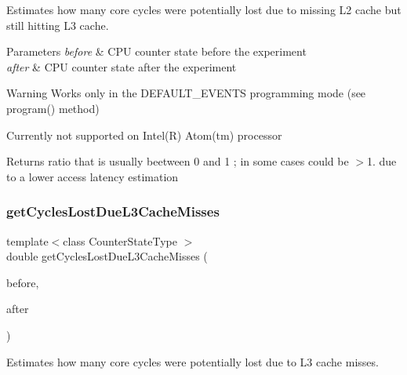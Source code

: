 Estimates how many core cycles were potentially lost due to missing L2 cache but still hitting L3 cache. 


\begin{DoxyParams}{Parameters}
{\em before} & C\+PU counter state before the experiment \\
\hline
{\em after} & C\+PU counter state after the experiment \\
\hline
\end{DoxyParams}
\begin{DoxyWarning}{Warning}
Works only in the D\+E\+F\+A\+U\+L\+T\+\_\+\+E\+V\+E\+N\+TS programming mode (see program() method) 

Currently not supported on Intel(\+R) Atom(tm) processor 
\end{DoxyWarning}
\begin{DoxyReturn}{Returns}
ratio that is usually beetween 0 and 1 ; in some cases could be $>$1. due to a lower access latency estimation 
\end{DoxyReturn}
\mbox{\label{class_basic_counter_state_a89d4cef9c83db7e76be6a0a2e7351e2e}} 
\subsubsection{\texorpdfstring{get\+Cycles\+Lost\+Due\+L3\+Cache\+Misses}{getCyclesLostDueL3CacheMisses}}
{\footnotesize\ttfamily template$<$class Counter\+State\+Type $>$ \\
double get\+Cycles\+Lost\+Due\+L3\+Cache\+Misses (\begin{DoxyParamCaption}\item[{const Counter\+State\+Type \&}]{before,  }\item[{const Counter\+State\+Type \&}]{after }\end{DoxyParamCaption})\hspace{0.3cm}{\ttfamily [friend]}}



Estimates how many core cycles were potentially lost due to L3 cache misses. 


